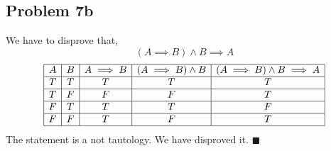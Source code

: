 \documentclass[answers]{exam}
\theoremstyle{mytheoremstyle}
\theoremstyle{mytheoremstyle}
\theoremstyle{myproblemstyle}
\begin{document}
\subsection*{Problem 7b}
\begin{framed}
	We have to disprove that,
	\[(A\implies B) \land B\implies A\]
	\begin{displaymath}
		\begin{array}{|c|c|c|c|c|c|}
			\hline
			A & B & A\implies B & (A\implies B)\land B & (A\implies B) \land B\implies A \\\hline
			T & T & T           & T                    & T                               \\\hline
			T & F & F           & F                    & T                               \\\hline
			F & T & T           & T                    & F                               \\\hline
			F & F & T           & F                    & T                               \\\hline
		\end{array}
	\end{displaymath}
	The statement is a not tautology. We have disproved it. \(\blacksquare\)
\end{framed}
\end{document}
